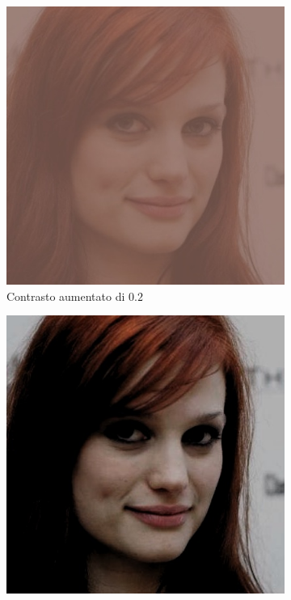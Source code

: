 \begin{figure}[ht]
\begin{subfigure}{0.2\textwidth}
\includegraphics[width=\textwidth]{./Images/contrast_severity_0.2.jpg}
\caption{Contrasto aumentato di $0.2$}
\label{sfig:corruption_contrast}
\end{subfigure}\hfill
\begin{subfigure}{0.2\textwidth}
\includegraphics[width=\textwidth]{./Images/brightness_severity_-0.3.jpg}

\end{subfigure}
\end{figure}
